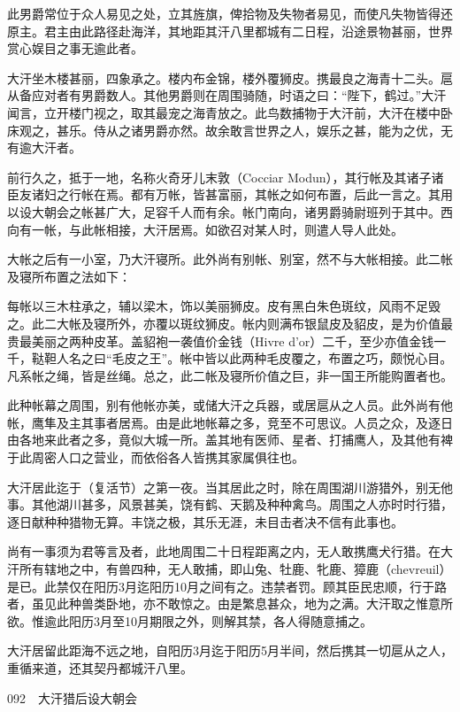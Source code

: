 \documentclass[12pt,UTF8]{ctexbook}
\begin{document}
此男爵常位于众人易见之处，立其旌旗，俾拾物及失物者易见，而使凡失物皆得还原主。君主由此路径赴海洋，其地距其汗八里都城有二日程，沿途景物甚丽，世界赏心娱目之事无逾此者。

大汗坐木楼甚丽，四象承之。楼内布金锦，楼外覆狮皮。携最良之海青十二头。扈从备应对者有男爵数人。其他男爵则在周围骑随，时语之曰：“陛下，鹤过。”大汗闻言，立开楼门视之，取其最宠之海青放之。此鸟数捕物于大汗前，大汗在楼中卧床观之，甚乐。侍从之诸男爵亦然。故余敢言世界之人，娱乐之甚，能为之优，无有逾大汗者。

前行久之，抵于一地，名称火奇牙儿末敦（Cocciar Modun），其行帐及其诸子诸臣友诸妇之行帐在焉。都有万帐，皆甚富丽，其帐之如何布置，后此一言之。其用以设大朝会之帐甚广大，足容千人而有余。帐门南向，诸男爵骑尉班列于其中。西向有一帐，与此帐相接，大汗居焉。如欲召对某人时，则遣人导人此处。

大帐之后有一小室，乃大汗寝所。此外尚有别帐、别室，然不与大帐相接。此二帐及寝所布置之法如下：

每帐以三木柱承之，辅以梁木，饰以美丽狮皮。皮有黑白朱色斑纹，风雨不足毁之。此二大帐及寝所外，亦覆以斑纹狮皮。帐内则满布银鼠皮及貂皮，是为价值最贵最美丽之两种皮革。盖貂袍一袭值价金钱（Hivre d'or）二千，至少亦值金钱一千，鞑靼人名之曰“毛皮之王”。帐中皆以此两种毛皮覆之，布置之巧，颇悦心目。凡系帐之绳，皆是丝绳。总之，此二帐及寝所价值之巨，非一国王所能购置者也。

此种帐幕之周围，别有他帐亦美，或储大汗之兵器，或居扈从之人员。此外尚有他帐，鹰隼及主其事者居焉。由是此地帐幕之多，竞至不可思议。人员之众，及逐日由各地来此者之多，竟似大城一所。盖其地有医师、星者、打捕鹰人，及其他有裨于此周密人口之营业，而依俗各人皆携其家属俱往也。

大汗居此迄于（复活节）之第一夜。当其居此之时，除在周围湖川游猎外，别无他事。其他湖川甚多，风景甚美，饶有鹤、天鹅及种种禽鸟。周围之人亦时时行猎，逐日献种种猎物无算。丰饶之极，其乐无涯，未目击者决不信有此事也。

尚有一事须为君等言及者，此地周围二十日程距离之内，无人敢携鹰犬行猎。在大汗所有辖地之中，有兽四种，无人敢捕，即山兔、牡鹿、牝鹿、獐鹿（chevreuil）是已。此禁仅在阳历3月迄阳历10月之间有之。违禁者罚。顾其臣民忠顺，行于路者，虽见此种兽类卧地，亦不敢惊之。由是繁息甚众，地为之满。大汗取之惟意所欲。惟逾此阳历3月至10月期限之外，则解其禁，各人得随意捕之。

大汗居留此距海不远之地，自阳历3月迄于阳历5月半间，然后携其一切扈从之人，重循来道，还其契丹都城汗八里。





092　大汗猎后设大朝会
\end{document}
